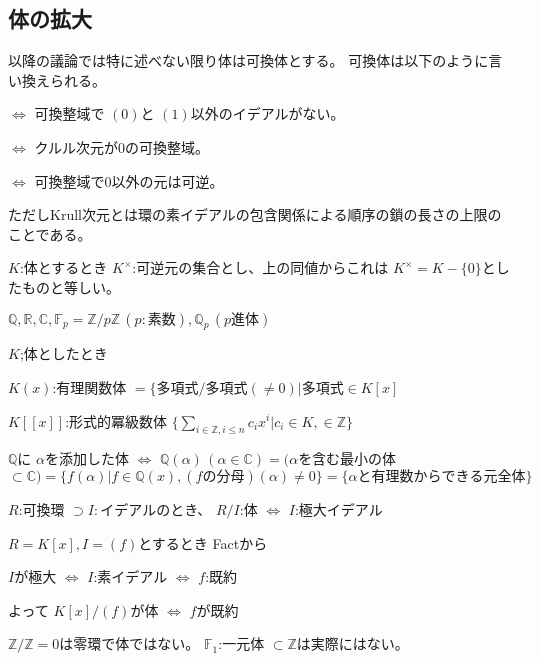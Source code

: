 \documentclass[../master_galois_theory]{subfiles}
\begin{document}
\setcounter{section}{1}

\subsection{体の拡大}

以降の議論では特に述べない限り体は可換体とする。
可換体は以下のように言い換えられる。

$\Leftrightarrow$ 可換整域で $(0)$と $(1)$以外のイデアルがない。

$\Leftrightarrow$ クルル次元が0の可換整域。

$\Leftrightarrow$ 可換整域で0以外の元は可逆。

ただしKrull次元とは環の素イデアルの包含関係による順序の鎖の長さの上限のことである。

$K$:体とするとき $K^\times$:可逆元の集合とし、上の同値からこれは $K^\times = K - \{ 0 \}$としたものと等しい。

\begin{exam}
  $\mathbb{Q}, \mathbb{R}, \mathbb{C}, \mathbb{F}_p = \mathbb{Z}/p\mathbb{Z} \, (p:素数), \mathbb{Q}_p \, (p進体)$
\end{exam}

\begin{exam}
  $K$;体としたとき

  $K(x)$:有理関数体 $= \{ 多項式 / 多項式(\neq 0) | 多項式 \in K[x]$

  $K[[x]]$:形式的冪級数体 $\{ \sum_{i \in \mathbb{Z} , i \leq n} c_i x^i | c_i \in K , \in \mathbb{Z} \}$

  $\mathbb{Q}$に $\alpha$を添加した体 $\Leftrightarrow$
  $\mathbb{Q}(\alpha) \, (\alpha \in \mathbb{C})
  = (\alpha$を含む最小の体 $\subset \mathbb{C})
  = \{ f(\alpha) | f \in \mathbb{Q}(x) , (fの分母)(\alpha) \neq 0 \}
  = \{ \alpha と有理数からできる元全体 \}$
\end{exam}

\begin{fact}
  $R$:可換環 $\supset I : イデアル$のとき、
  $R/I$:体 $\Leftrightarrow$ $I$:極大イデアル
\end{fact}

\begin{exam}
  $R = K[x] , I = (f)$とするとき Factから

  $I$が極大 $\Leftrightarrow$ $I$:素イデアル $\Leftrightarrow$ $f$:既約

  よって $K[x]/(f)$が体 $\Leftrightarrow$ $f$が既約
\end{exam}

\begin{rem}
  $\mathbb{Z}/\mathbb{Z} = 0$は零環で体ではない。
  $\mathbb{F}_1$:一元体 $\subset \mathbb{Z}$は実際にはない。
\end{rem}
\end{document}
